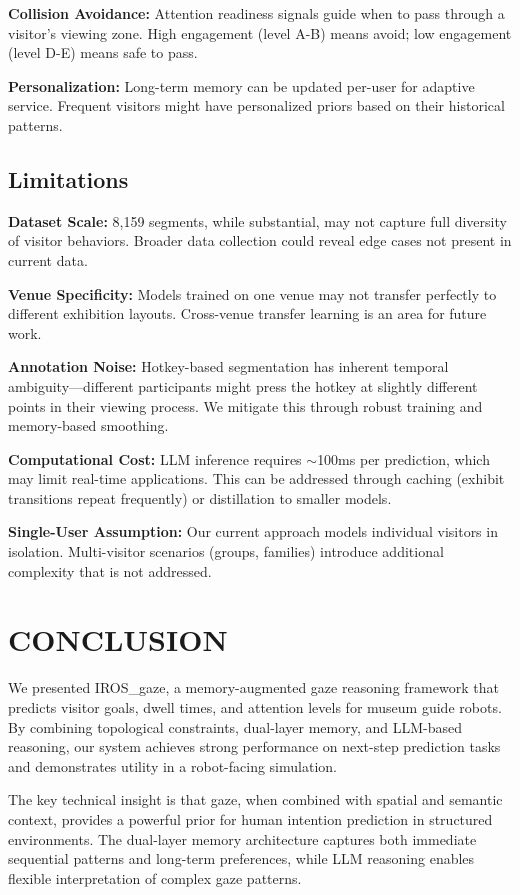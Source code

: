 \documentclass[letterpaper]{article}
\begin{document}
\textbf{Collision Avoidance:} Attention readiness signals guide when to pass through a visitor's viewing zone. High engagement (level A-B) means avoid; low engagement (level D-E) means safe to pass.

\textbf{Personalization:} Long-term memory can be updated per-user for adaptive service. Frequent visitors might have personalized priors based on their historical patterns.

\subsection{Limitations}

\textbf{Dataset Scale:} 8,159 segments, while substantial, may not capture full diversity of visitor behaviors. Broader data collection could reveal edge cases not present in current data.

\textbf{Venue Specificity:} Models trained on one venue may not transfer perfectly to different exhibition layouts. Cross-venue transfer learning is an area for future work.

\textbf{Annotation Noise:} Hotkey-based segmentation has inherent temporal ambiguity—different participants might press the hotkey at slightly different points in their viewing process. We mitigate this through robust training and memory-based smoothing.

\textbf{Computational Cost:} LLM inference requires $\sim$100ms per prediction, which may limit real-time applications. This can be addressed through caching (exhibit transitions repeat frequently) or distillation to smaller models.

\textbf{Single-User Assumption:} Our current approach models individual visitors in isolation. Multi-visitor scenarios (groups, families) introduce additional complexity that is not addressed.

\section{CONCLUSION}

We presented IROS\_gaze, a memory-augmented gaze reasoning framework that predicts visitor goals, dwell times, and attention levels for museum guide robots. By combining topological constraints, dual-layer memory, and LLM-based reasoning, our system achieves strong performance on next-step prediction tasks and demonstrates utility in a robot-facing simulation.

The key technical insight is that gaze, when combined with spatial and semantic context, provides a powerful prior for human intention prediction in structured environments. The dual-layer memory architecture captures both immediate sequential patterns and long-term preferences, while LLM reasoning enables flexible interpretation of complex gaze patterns.
\end{document}
